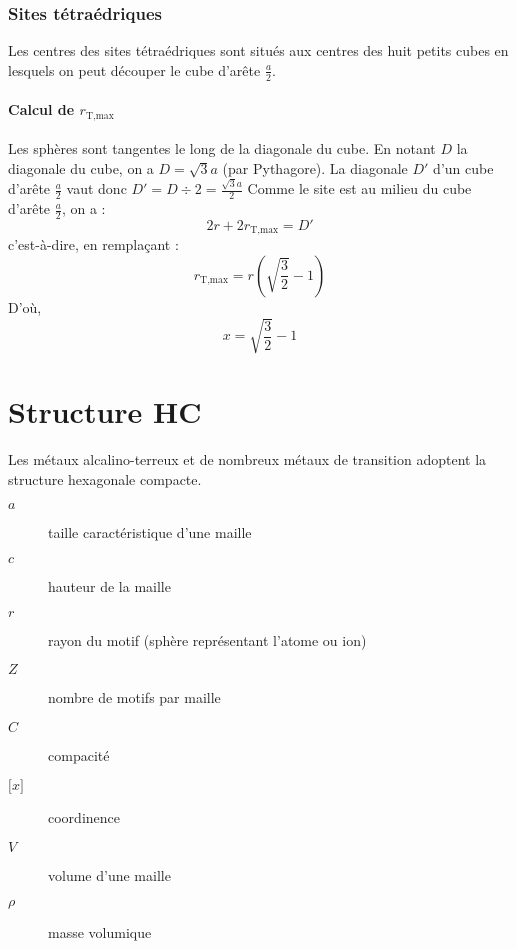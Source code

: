 \subsubsection{Sites tétraédriques}
Les centres des sites tétraédriques sont situés aux centres des
huit petits cubes en lesquels on peut découper le cube d’arête
$\frac{a}{2}$.
\paragraph{Calcul de $r_{\text{T,max}}$}
Les sphères sont tangentes le long de la diagonale du cube.
En notant $D$ la diagonale du cube, on a $D = \sqrt{3}a$
(par Pythagore). La diagonale $D'$ d'un cube d'arête $\frac{a}{2}$
vaut donc $D' = D\div 2 = \frac{\sqrt{3}a}{2}$
Comme le site est au milieu du cube d'arête $\frac{a}{2}$, on a :
\begin{equation*}
    2r + 2r_{\text{T,max}} = D'
\end{equation*}
c'est-à-dire, en remplaçant :
\begin{equation}
    \boxed{r_{\text{T,max}} = r(\sqrt{\frac{3}{2}} - 1)}\label{eq:rmax_tetra}
\end{equation}
D'où,
\begin{equation}
    x = \sqrt{\frac{3}{2}} - 1
\end{equation}


\section{Structure HC}
Les métaux alcalino-terreux et de nombreux métaux de transition
adoptent la structure hexagonale compacte.
\begin{description}
    \item[$a$] taille caractéristique d'une maille
    \item[$c$] hauteur de la maille
    \item[$r$] rayon du motif (sphère représentant l'atome ou ion)
    \item[$Z$] nombre de motifs par maille
    \item[$C$] compacité
    \item[$\lbrack x \rbrack$] coordinence
    \item[$V$] volume d'une maille
    \item[$\rho$] masse volumique
\end{description}
